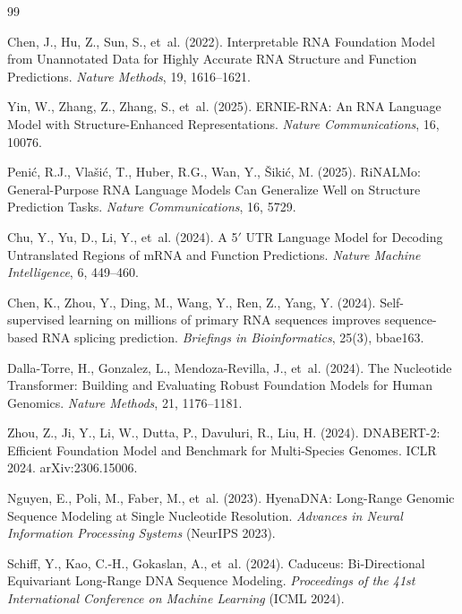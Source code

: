 \documentclass[11pt]{article}
\begin{document}
\begin{thebibliography}{99}

Chen, J., Hu, Z., Sun, S., et~al. (2022).
Interpretable RNA Foundation Model from Unannotated Data for Highly
Accurate RNA Structure and Function Predictions.
\emph{Nature Methods}, 19, 1616--1621.

Yin, W., Zhang, Z., Zhang, S., et~al. (2025).
ERNIE-RNA: An RNA Language Model with Structure-Enhanced Representations.
\emph{Nature Communications}, 16, 10076.

Peni\'c, R.J., Vla\v{s}i\'c, T., Huber, R.G., Wan, Y.,
\v{S}iki\'c, M. (2025).
RiNALMo: General-Purpose RNA Language Models Can Generalize Well on
Structure Prediction Tasks.
\emph{Nature Communications}, 16, 5729.

Chu, Y., Yu, D., Li, Y., et~al. (2024).
A 5$'$ UTR Language Model for Decoding Untranslated Regions of mRNA and
Function Predictions.
\emph{Nature Machine Intelligence}, 6, 449--460.

Chen, K., Zhou, Y., Ding, M., Wang, Y., Ren, Z., Yang, Y. (2024).
Self-supervised learning on millions of primary RNA sequences improves
sequence-based RNA splicing prediction.
\emph{Briefings in Bioinformatics}, 25(3), bbae163.

Dalla-Torre, H., Gonzalez, L., Mendoza-Revilla, J., et~al. (2024).
The Nucleotide Transformer: Building and Evaluating Robust Foundation
Models for Human Genomics.
\emph{Nature Methods}, 21, 1176--1181.

Zhou, Z., Ji, Y., Li, W., Dutta, P., Davuluri, R., Liu, H. (2024).
DNABERT-2: Efficient Foundation Model and Benchmark for Multi-Species
Genomes. ICLR 2024. arXiv:2306.15006.

Nguyen, E., Poli, M., Faber, M., et~al. (2023).
HyenaDNA: Long-Range Genomic Sequence Modeling at Single Nucleotide
Resolution.
\emph{Advances in Neural Information Processing Systems} (NeurIPS 2023).

Schiff, Y., Kao, C.-H., Gokaslan, A., et~al. (2024).
Caduceus: Bi-Directional Equivariant Long-Range DNA Sequence Modeling.
\emph{Proceedings of the 41st International Conference on Machine
Learning} (ICML 2024).


\end{thebibliography}
\end{document}
